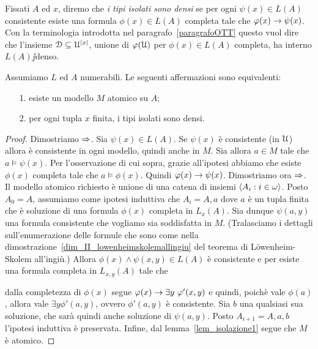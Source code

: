 Fissati $A$ ed $x$, diremo che \emph{i tipi isolati sono densi\/} se  per ogni $\psi(x)\in L(A)$ consistente esiste una formula $\phi(x)\in L(A)$ completa tale che $\varphi(x)\rightarrow\psi(x)$. Con la terminologia introdotta nel paragrafo~\ref{paragrafoOTT} questo vuol dire che l'insieme $\EuScript D\subseteq\EuScript U^{|x|}$, unione di $\varphi(\EuScript U)$ per $\phi(x)\in L(A)$ completa, ha interno $L(A)\jj$denso.

\begin{proposition}\label{prop_atomico_isolatidensi}
Assumiamo $L$ ed $A$ numerabili. Le seguenti affermazioni sono equivalenti:
\begin{itemize}
\item[1.] esiste un modello $M$ atomico su $A$;
\item[2.] per ogni tupla $x$ finita, i tipi isolati sono densi. 
\end{itemize}
\end{proposition}

\begin{proof}
Dimostriamo $\Rightarrow$. Sia $\psi(x) \in L(A)$. Se $\psi(x)$ \`e consistente (in $\EuScript U$) allora \`e consistente in ogni modello, quindi anche in $M$. Sia allora $a \in M$ tale che $a \models \psi(x)$. Per l'osservazione di cui sopra, grazie all'ipotesi abbiamo che esiste $\phi(x)$ completa tale che $a \models \phi(x)$. Quindi $\varphi(x) \rightarrow \psi(x)$. Dimostriamo ora $\Rightarrow$. Il modello atomico richiesto \`e unione di una catena di insiemi $\langle A_i:i\in\omega\rangle$. Posto $A_0=A$, assumiamo come ipotesi induttiva che $A_i=A,a$ dove $a$ \`e un tupla finita che \`e soluzione di una formula $\phi(x)$ completa in $L_x(A)$.  Sia dunque $\psi(a,y)$ una formula consistente che vogliamo sia soddisfatta in $M$. (Tralasciamo i dettagli sull'enumerazione delle formule che sono come nella dimostrazione~\ref{dim_II_lowenheimskolemallingiu} del teorema di L\"owenheim-Skolem all'ingi\`u.) Allora $\phi(x)\wedge\psi(x,y) \in L(A)$ \`e consistente e per  esiste una formula completa in $L_{x,y}(A)$ tale che


dalla completezza di $\phi(x)$ segue $\varphi(x)\rightarrow\exists y\ \varphi'(x,y)$ e quindi, poich\`e vale $\phi(a)$, allora vale $\exists y \phi'(a,y)$, ovvero $\phi'(a,y)$ \`e consistente. Sia $b$ una qualsiasi sua soluzione, che sar\`a quindi anche soluzione di $\psi(a,y)$. Posto $A_{i+1}=A,a,b$ l'ipotesi induttiva \`e preservata. Infine, dal lemma~\ref{lem_isolazione1} segue  che $M$ \`e atomico.
\end{proof}



